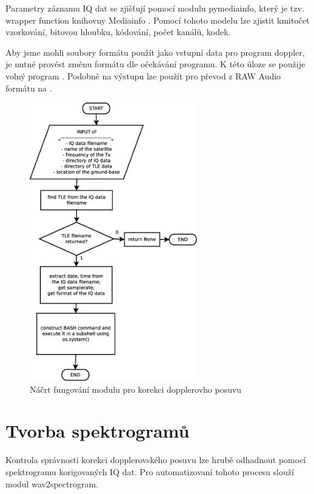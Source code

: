   Parametry záznamu IQ dat se zjišťují pomocí modulu pymediainfo, který je tzv. wrapper function knihovny Mediainfo \cite{github:pymediainfo}. Pomocí tohoto modelu lze zjistit kmitočet vzorkování, bitovou hloubku, kódování, počet kanálů, kodek.

  Aby jsme mohli soubory formátu  použít jako vstupní data pro program doppler, je nutné provést změnu formátu dle očekávání programu. K této úloze se použije volný program . Podobně na výstupu lze použít  pro převod z RAW Audio formátu na .

  \begin{figure}[ht]
    \centering
    \includegraphics[width=0.65\textwidth]{./obrazky/get_undopplered.eps}
    \caption{Náčrt fungování modulu pro korekci dopplerovho posuvu}
    \label{fig:undoppler}
  \end{figure}

\section{Tvorba spektrogramů}

Kontrola správnosti korekci dopplerovského posuvu lze hrubě odhadnout pomocí spektrogramu korigovaných IQ dat. Pro automatizovaní tohoto procesu slouží modul wav2spectrogram.


